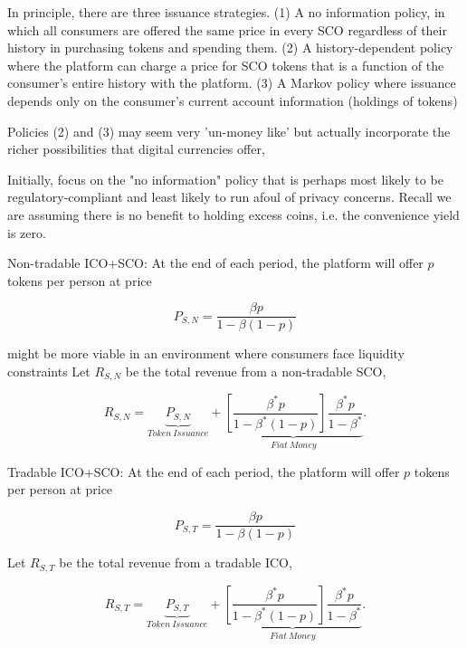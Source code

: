In principle, there are three issuance strategies. (1) A no information policy, in which all consumers are offered the same price in every SCO regardless of their history in purchasing tokens and spending them. (2) A history-dependent policy where the platform can charge a price for SCO tokens that is a function of the consumer's entire history with the platform. (3) A Markov policy where issuance depends only on the consumer's current account information (holdings of tokens)

Policies (2) and (3) may seem very 'un-money like' but actually incorporate the richer possibilities that digital currencies offer,

Initially, focus on the "no information" policy that is perhaps most likely to
be regulatory-compliant and least likely to run afoul of privacy concerns. Recall we are assuming there is no benefit to holding excess coins, i.e. the convenience yield is zero.

Non-tradable ICO+SCO: At the end of each period, the platform will offer $p$ tokens per person at price

\begin{equation}
    P_{S,N}=\frac{\beta p}{1-\beta(1-p)}
\end{equation}

might be more viable in an environment where consumers face liquidity constraints
Let $R_{S,N}$ be the total revenue from a non-tradable SCO,

\begin{equation}
    R_{S,N} = \underbrace{P_{S,N}}_{Token~Issuance}
    +
    \underbrace{\left[\frac{\beta^{*}p}{1-\beta^{*}(1-p)}\right]
    \frac{\beta^{*}p}{1-\beta^{*}}}_{Fiat~Money}.
\end{equation}

Tradable ICO+SCO: At the end of each period, the platform will offer $p$ tokens per person at price

\begin{equation}
    P_{S,T}=\frac{\beta p}{1-\beta(1-p)}
\end{equation}

Let $R_{S,T}$ be the total revenue from a tradable ICO,

\begin{equation}
    R_{S,T} = \underbrace{P_{S,T}}_{Token~Issuance}
    +
    \underbrace{\left[\frac{\beta^{*}p}{1-\beta^{*}(1-p)}\right]
    \frac{\beta^{*}p}{1-\beta^{*}}}_{Fiat~Money}.
\end{equation}


